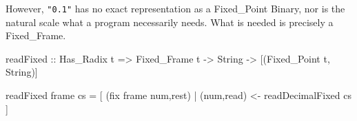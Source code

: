 \documentclass{article}
\begin{document}
However, \verb|"0.1"| has no exact representation as a
Fixed\_Point Binary, nor is the natural scale what a
program necessarily needs.  What is needed is precisely
a Fixed\_Frame.

\begin{code}
readFixed :: Has_Radix t =>
             Fixed\_Frame t -> String ->
             [(Fixed_Point t, String)]

readFixed frame cs =
   [ (fix frame num,rest) | (num,read) <- readDecimalFixed cs ]
\end{code}
\end{document}
